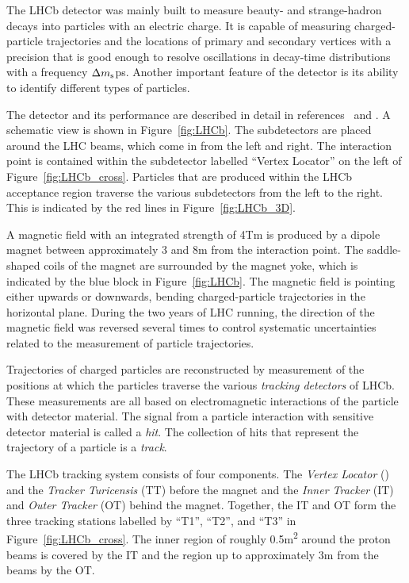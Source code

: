 The LHCb detector was mainly built to measure beauty- and strange-hadron decays into particles with an electric charge. It is capable of
measuring charged-particle trajectories and the locations of primary and secondary vertices with a precision that is good enough to resolve
oscillations in decay-time distributions with a frequency $\Delta m_\text{s}$\unitsp{}ps. Another important feature of the detector is its
ability to identify different types of particles.

The detector and its performance are described in detail in references~\cite{Alves:2008zz} and \cite{LHCb-DP-2014-002}. A schematic view is
shown in Figure~\ref{fig:LHCb}. The subdetectors are placed around the LHC beams, which come in from the left and right. The interaction
point is contained within the subdetector labelled ``Vertex Locator'' on the left of Figure~\ref{fig:LHCb_cross}. Particles that are
produced within the LHCb acceptance region traverse the various subdetectors from the left to the right. This is indicated by the red lines
in Figure~\ref{fig:LHCb_3D}.

A magnetic field with an integrated strength of 4\unitsp{}Tm is produced by a dipole magnet between approximately 3 and 8\unitsp{}m from
the interaction point. The saddle-shaped coils of the magnet are surrounded by the magnet yoke, which is indicated by the blue block in
Figure~\ref{fig:LHCb}. The magnetic field is pointing either upwards or downwards, bending charged-particle trajectories in the horizontal
plane. During the two years of LHC running, the direction of the magnetic field was reversed several times to control systematic
uncertainties related to the measurement of particle trajectories.

Trajectories of charged particles are reconstructed by measurement of the positions at which the particles traverse the various
\emph{tracking detectors} of LHCb. These measurements are all based on electromagnetic interactions of the particle with detector material.
The signal from a particle interaction with sensitive detector material is called a \emph{hit}. The collection of hits that represent the
trajectory of a particle is a \emph{track}.

The LHCb tracking system consists of four components. The \emph{Vertex Locator} (\velo) and the \emph{Tracker Turicensis} (TT)
before the magnet and the \emph{Inner Tracker} (IT) and \emph{Outer Tracker} (OT) behind the magnet. Together, the IT and OT form the
three tracking stations labelled by ``T1'', ``T2'', and ``T3'' in Figure~\ref{fig:LHCb_cross}. The inner region of roughly
0.5\unitsp{}m\textsuperscript{2} around the proton beams is covered by the IT and the region up to approximately 3\unitsp{}m from the beams
by the OT.


